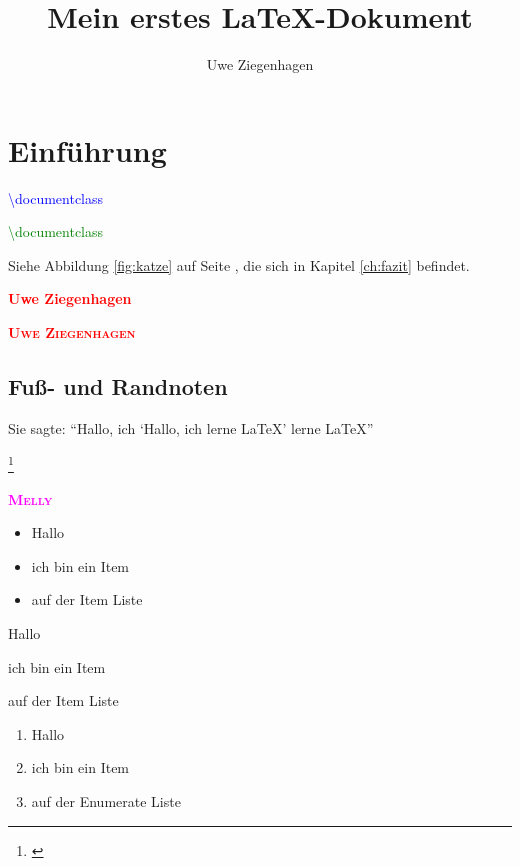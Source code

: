 \documentclass[ngerman,12pt,parskip=half]{scrreprt}
\author{Uwe Ziegenhagen}
\title{Mein erstes \LaTeX-Dokument}
\newcommand{\person}[1]{\textcolor{red}{\textsc{\textbf{#1}}}}
\newcommand{\tier}[1]{\textcolor{magenta}{\textsc{\textbf{#1}}}}
\newcommand{\latexbefehl}[1]{\textcolor{blue}{\ttfamily\textbackslash #1}}
\newcommand{\zweiparams}[2]{\textcolor{#1}{\ttfamily\textbackslash #2}}
\begin{document}
 
\maketitle

\tableofcontents

\listoffigures

\listoftables

\chapter{Einführung}

\latexbefehl{documentclass}

\zweiparams{green}{documentclass}

Siehe Abbildung \ref{fig:katze} auf Seite \pageref{fig:katze}, die sich in Kapitel \ref{ch:fazit} befindet.

\textcolor{red}{\textbf{Uwe Ziegenhagen}}

\person{Uwe Ziegenhagen}

\section{Fuß- und Randnoten}

\blindtext{}

Sie sagte: \enquote{Hallo, ich \enquote{Hallo, ich lerne LaTeX} lerne LaTeX}

\blindtext\footnote{\textcolor{red}{\blindtext[2]}}


\tier{Melly}

\begin{itemize}[\(\Rightarrow\)]
\item Hallo
\item ich bin ein Item
\item auf der Item Liste
\end{itemize}

\begin{compactitem}[\(\Rightarrow\)]
\item Hallo
\item ich bin ein Item
\item auf der Item Liste
\end{compactitem}


\begin{enumerate}[i]
\item Hallo
\item ich bin ein Item
\item auf der Enumerate Liste
\end{enumerate}
\end{document}
